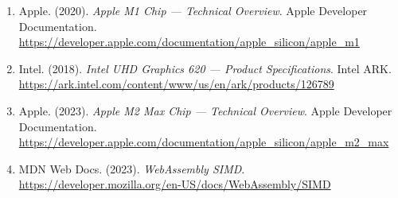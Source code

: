 \documentclass[PhD]{PHlab-thesis}
\begin{document}
\begin{enumerate}
  \item Apple. (2020). \emph{Apple M1 Chip — Technical Overview}. Apple Developer Documentation. \url{https://developer.apple.com/documentation/apple_silicon/apple_m1}

  \item Intel. (2018). \emph{Intel UHD Graphics 620 — Product Specifications}. Intel ARK. \url{https://ark.intel.com/content/www/us/en/ark/products/126789}

  \item Apple. (2023). \emph{Apple M2 Max Chip — Technical Overview}. Apple Developer Documentation. \url{https://developer.apple.com/documentation/apple_silicon/apple_m2_max}

  \item MDN Web Docs. (2023). \emph{WebAssembly SIMD}. \url{https://developer.mozilla.org/en-US/docs/WebAssembly/SIMD}
\end{enumerate}


\newpage
{}
\printbibliography
\end{document}
